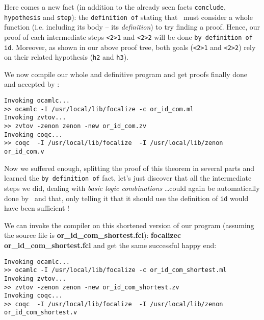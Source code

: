 \documentclass[11pt,a4paper,twoside,onecolumn,fullpage]{article}
\begin{document}
Here comes
a new fact (in addition to the already seen facts \lstinline"conclude",
\lstinline"hypothesis" and \lstinline"step"): the
\lstinline"definition of" stating that \zenon\ must consider a whole
function (i.e. including its body -- its {\em definition}) to try
finding a proof. Hence, our proof of each intermediate steps
\lstinline"<2>1" and \lstinline"<2>2" will be done
\lstinline"by definition of id". Moreover, as shown in our above proof
tree, both goals (\lstinline"<2>1" and \lstinline"<2>2") rely on their
related hypothesis (\lstinline"h2" and \lstinline"h3").

{\scriptsize
}

We now compile our whole and definitive program and get proofs finally
done and accepted by \coq:

{\scriptsize
\begin{verbatim}
Invoking ocamlc...
>> ocamlc -I /usr/local/lib/focalize -c or_id_com.ml
Invoking zvtov...
>> zvtov -zenon zenon -new or_id_com.zv
Invoking coqc...                                                
>> coqc  -I /usr/local/lib/focalize  -I /usr/local/lib/zenon or_id_com.v
\end{verbatim}}

Now we suffered enough, splitting the proof of this theorem in several
parts and learned the \lstinline{by definition of} fact, let's just
discover that all the intermediate steps we did, dealing with {\em basic
logic combinations} \ldots could again be automatically done by
\zenon\ and that, only telling it that it should use the definition of
\lstinline{id} would have been sufficient !

{\scriptsize
}

We can invoke the compiler on this shortened version of our program
(assuming the source file is \textbf{or\_id\_com\_shortest.fcl}):
\textbf{focalizec or\_id\_com\_shortest.fcl} and get the same successful
happy end:

{\scriptsize
\begin{verbatim}
Invoking ocamlc...
>> ocamlc -I /usr/local/lib/focalize -c or_id_com_shortest.ml
Invoking zvtov...
>> zvtov -zenon zenon -new or_id_com_shortest.zv
Invoking coqc...                                               
>> coqc  -I /usr/local/lib/focalize  -I /usr/local/lib/zenon or_id_com_shortest.v
\end{verbatim}}
\end{document}
